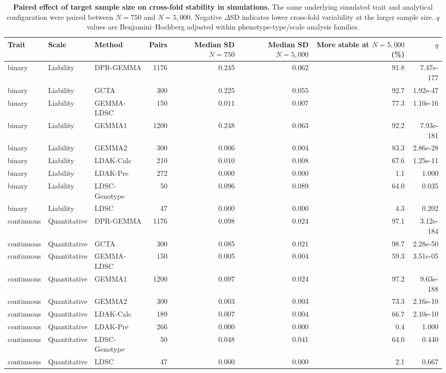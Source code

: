 \begin{table}[!ht]
\centering
\caption{\textbf{Paired effect of target sample size on cross-fold stability in simulations.} The same underlying simulated trait and analytical configuration were paired between $N=750$ and $N=5{,}000$. Negative $\Delta$SD indicates lower cross-fold variability at the larger sample size. $q$ values are Benjamini--Hochberg adjusted within phenotype-type/scale analysis families.}
\label{tab:simulation_stability_n}
\scriptsize
\begin{tabular}{lllrrrrr}
\toprule
Trait & Scale & Method & Pairs & Median SD $N=750$ & Median SD $N=5{,}000$ & More stable at $N=5{,}000$ (\%) & $q$ \\
\midrule
binary & Liability & DPR-GEMMA & 1176 & 0.245 & 0.062 & 91.8 & 7.47e-177 \\
binary & Liability & GCTA & 300 & 0.225 & 0.055 & 92.7 & 1.92e-47 \\
binary & Liability & GEMMA-LDSC & 150 & 0.011 & 0.007 & 77.3 & 1.10e-16 \\
binary & Liability & GEMMA1 & 1200 & 0.248 & 0.063 & 92.2 & 7.93e-181 \\
binary & Liability & GEMMA2 & 300 & 0.006 & 0.004 & 83.3 & 2.86e-28 \\
binary & Liability & LDAK-Calc & 210 & 0.010 & 0.008 & 67.6 & 1.25e-11 \\
binary & Liability & LDAK-Pre & 272 & 0.000 & 0.000 & 1.1 & 1.000 \\
binary & Liability & LDSC-Genotype & 50 & 0.096 & 0.089 & 64.0 & 0.035 \\
binary & Liability & LDSC & 47 & 0.000 & 0.000 & 4.3 & 0.202 \\
continuous & Quantitative & DPR-GEMMA & 1176 & 0.098 & 0.024 & 97.1 & 3.12e-184 \\
continuous & Quantitative & GCTA & 300 & 0.085 & 0.021 & 98.7 & 2.28e-50 \\
continuous & Quantitative & GEMMA-LDSC & 150 & 0.005 & 0.004 & 59.3 & 3.51e-05 \\
continuous & Quantitative & GEMMA1 & 1200 & 0.097 & 0.024 & 97.2 & 9.63e-188 \\
continuous & Quantitative & GEMMA2 & 300 & 0.003 & 0.003 & 73.3 & 2.16e-10 \\
continuous & Quantitative & LDAK-Calc & 189 & 0.007 & 0.004 & 66.7 & 2.10e-10 \\
continuous & Quantitative & LDAK-Pre & 266 & 0.000 & 0.000 & 0.4 & 1.000 \\
continuous & Quantitative & LDSC-Genotype & 50 & 0.048 & 0.041 & 64.0 & 0.440 \\
continuous & Quantitative & LDSC & 47 & 0.000 & 0.000 & 2.1 & 0.667 \\
\bottomrule
\end{tabular}
\end{table}
